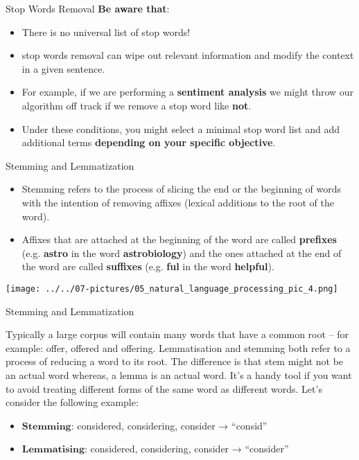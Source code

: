 \documentclass[11pt]{beamer}
\newcommand{\highlight}[1]{%
  \colorbox{yellow!100}{$\displaystyle#1$}}
\begin{document}
\begin{frame}{Stop Words Removal}
	\textbf{Be aware that}:
	\begin{itemize}
		\item There is no universal list of stop words!
		\item stop words removal can wipe out relevant information and modify the context in a given sentence. 
		\item For example, if we are performing a \textbf{sentiment analysis} we might throw our algorithm off track if we remove a stop word like \textbf{not}. 
		\item Under these conditions, you might select a minimal stop word list and add additional terms \textbf{depending on your specific objective}.
	\end{itemize}
\end{frame}
\begin{frame}{Stemming and Lemmatization}
	\begin{itemize}
		\item Stemming refers to the process of slicing the end or the beginning of words with the intention of removing affixes (lexical additions to the root of the word).
		\item Affixes that are attached at the beginning of the word are called \textbf{prefixes} (e.g. \textbf{ astro } in the word \textbf{ astrobiology}) and the ones attached at the end of the word are called \textbf{suffixes} (e.g. \textbf{ ful} in the word \textbf{ helpful}).
	\end{itemize}
	\begin{center}
	\texttt{[image: ../../07-pictures/05\_natural\_language\_processing\_pic\_4.png]}
	\end{center}
\end{frame}
\begin{frame}{Stemming and Lemmatization}

Typically a large corpus will contain many words that have a common root – for example: offer, offered and offering. Lemmatisation and stemming both refer to a process of reducing a word to its root. The difference is that stem might not be an actual word whereas, a lemma is an actual word. It’s a handy tool if you want to avoid treating different forms of the same word as different words. Let's consider the following example:
\begin{itemize}
	\item \highlight{\textbf{Stemming}}: considered, considering, consider → “consid”
	\item \highlight{\textbf{Lemmatising}}: considered, considering, consider → “consider”
\end{itemize}
\end{frame}
\end{document}
